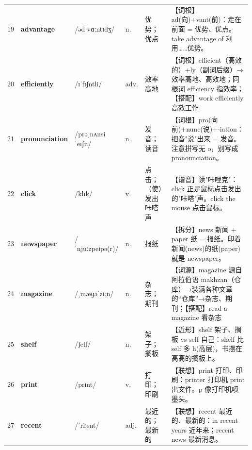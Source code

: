 \documentclass[UTF8,a4paper,11pt,oneside]{ctexbook}
\newcommand{\cellword}[1]{{\bfseries\textcolor{wordcol}{#1}}}
\newcommand{\cellipa}[1]{{\footnotesize\textcolor{ipacol}{#1}}}
\newcommand{\cellpos}[1]{\textcolor{poscol}{#1}}
\newcommand{\cellno}[1]{\textcolor{volcolor!75!black}{#1}}
\begin{document}
{\begin{longtable}{@{}C{0.045\textwidth}L{0.155\textwidth}L{0.175\textwidth}C{0.070\textwidth}L{0.180\textwidth}L{0.282\textwidth}@{}}
 \cellno{19} & \cellword{advantage} & \cellipa{/ədˈvɑːntɪdʒ/} & \cellpos{n.} & 优势；优点 & \textcolor{tagRoot}{【词根】}ad(向)+vant(前)：走在前面 = 优势、优点。take advantage of 利用……优势。 \\
\cellno{20} & \cellword{efficiently} & \cellipa{/ɪˈfɪʃntli/} & \cellpos{adv.} & 效率高地 & \textcolor{tagRoot}{【词根】}efficient（高效的）+ly（副词后缀）→\allowbreak{}效率高地、高效地；同根词 efficiency 指效率；\textcolor{tagColloc}{【搭配】}work efficiently 高效工作 \\
 \cellno{21} & \cellword{pronunciation} & \cellipa{/prəˌnʌnsiˈeɪʃn/} & \cellpos{n.} & 发音；读音 & \textcolor{tagRoot}{【词根】}pro(向前)+nunc(说)+-iation：把音"说"出来 = 发音。注意拼写无 o，别写成 pronounciation。 \\
\cellno{22} & \cellword{click} & \cellipa{/klɪk/} & \cellpos{v.} & 点击；（使）发出咔嗒声 & \textcolor{tagSound}{【谐音】}读"咔哩克"：click 正是鼠标点击发出的"咔嗒"声。click the mouse 点击鼠标。 \\
 \cellno{23} & \cellword{newspaper} & \cellipa{/ˈnjuːzpeɪpə(r)/} & \cellpos{n.} & 报纸 & \textcolor{tagSplit}{【拆分】}news 新闻 + paper 纸 = 报纸。印着新闻(news)的纸(paper)就是 newspaper。 \\
\cellno{24} & \cellword{magazine} & \cellipa{/ˌmæɡəˈziːn/} & \cellpos{n.} & 杂志；期刊 & \textcolor{tagEtym}{【词源】}magazine 源自阿拉伯语 makhzan（仓库）→\allowbreak{}装满各种文章的“仓库”→\allowbreak{}杂志、期刊；\textcolor{tagColloc}{【搭配】}read a magazine 看杂志 \\
 \cellno{25} & \cellword{shelf} & \cellipa{/ʃelf/} & \cellpos{n.} & 架子；搁板 & \textcolor{tagNear}{【近形】}shelf 架子、搁板 vs self 自己：shelf 比 self 多 h(高层)，书摆在高高的搁板上。 \\
\cellno{26} & \cellword{print} & \cellipa{/prɪnt/} & \cellpos{v.} & 打印；印刷 & \textcolor{tagAssoc}{【联想】}print 打印、印刷：printer 打印机 print 出文件。p 像打印机喷墨头。 \\
 \cellno{27} & \cellword{recent} & \cellipa{/ˈriːsnt/} & \cellpos{adj.} & 最近的；最新的 & \textcolor{tagAssoc}{【联想】}recent 最近的、最新的：in recent years 近年来；recent news 最新消息。 \\
\end{longtable}
}

\end{document}
